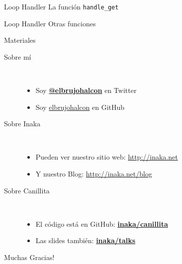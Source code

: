 \documentclass[utf8,hyperref={colorlinks=true}]{beamer}
\begin{document}
\begin{frame}[t]{Loop Handler}
{La funci\'on \texttt{handle\_get}}
\end{frame}

\begin{frame}[t]{Loop Handler}
{Otras funciones}
\end{frame}

\appendix

\begin{frame}{Materiales}
	\begin{description}
		\item[Sobre m\'i]~\\
			\begin{itemize}
				\item Soy \textbf{\href{http://twitter.com/elbrujohalcon}{@elbrujohalcon}} en Twitter
				\item Soy \href{http://github.com/elbrujohalcon}{elbrujohalcon} en GitHub
			\end{itemize}
		\item[Sobre Inaka]~\\
			\begin{itemize}
				\item Pueden ver nuestro sitio web: \href{http://inaka.net}{http://inaka.net}
				\item Y nuestro Blog: \href{http://inaka.net/blog}{http://inaka.net/blog}
			\end{itemize}
		\item[Sobre Canillita]~\\
			\begin{itemize}
				\item El c\'odigo est\'a en GitHub: \textbf{\href{https://github.com/inaka/canillita}{inaka/canillita}}
				\item Las slides tambi\'en: \textbf{\href{https://github.com/inaka/talks}{inaka/talks}}
			\end{itemize}
	\end{description}
\end{frame}

\begin{frame}
	\begin{center}
		{\Huge Muchas Gracias!}
	\end{center}
\end{frame}
\end{document}
